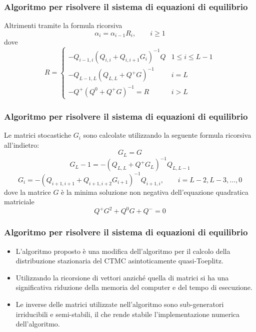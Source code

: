 \documentclass{beamer}
\begin{document}
\begin{frame}
    \frametitle{Algoritmo per risolvere il sistema di equazioni di equilibrio}
    \begin{theorem}
        Altrimenti tramite la formula ricorsiva
        \begin{equation*}\label{eq:rec-alpha}
            \alpha_i = \alpha_{i-1} R_i, \qquad i \geq 1
        \end{equation*}
        dove
        \begin{equation*}
            R =
            \begin{cases}
                -Q_{i-1,i}(Q_{i,i} + Q_{i,i+1}G_i)^{-1}Q & 1 \leq i \leq L-1 \\
                -Q_{L-1,L}(Q_{L,L} + Q^+G)^{-1} & i = L \\
                -Q^+(Q^0 + Q^+G)^{-1} = R & i>L
            \end{cases}
        \end{equation*}
    \end{theorem}
\end{frame}


\begin{frame}
    \frametitle{Algoritmo per risolvere il sistema di equazioni di equilibrio}
    \begin{theorem}
        Le matrici stocastiche $G_i$ sono calcolate utilizzando la seguente formula ricorsiva all'indietro:
                $$G_L = G$$
                $$G_L-1 = -(Q_{L,L} + Q^+G_L)^{-1}Q_{L,L-1}$$
                $$G_i = -(Q_{i+1,i+1} + Q_{i+1,i+2}G_{i+1})^{-1}Q_{i+1,i}, \qquad i = L-2, L-3, \dots, 0$$
        dove la matrice $G$ è la minima soluzione non negativa dell'equazione quadratica matriciale
        \begin{equation*}
            Q^+G^2 + Q^0G + Q^- = 0
        \end{equation*}
    \end{theorem}
\end{frame}


\begin{frame}
    \frametitle{Algoritmo per risolvere il sistema di equazioni di equilibrio}
    \begin{itemize}
        \item L'algoritmo proposto è una modifica dell'algoritmo per il calcolo della distribuzione stazionaria del CTMC asintoticamente quasi-Toeplitz.
        \item Utilizzando la ricorsione di vettori anziché quella di matrici si ha una significativa riduzione della memoria del computer e del tempo di esecuzione.
        \item Le inverse delle matrici utilizzate nell'algoritmo sono sub-generatori irriducibili e semi-stabili, il che rende stabile l'implementazione numerica dell'algoritmo.
    \end{itemize}
\end{frame}
\end{document}
